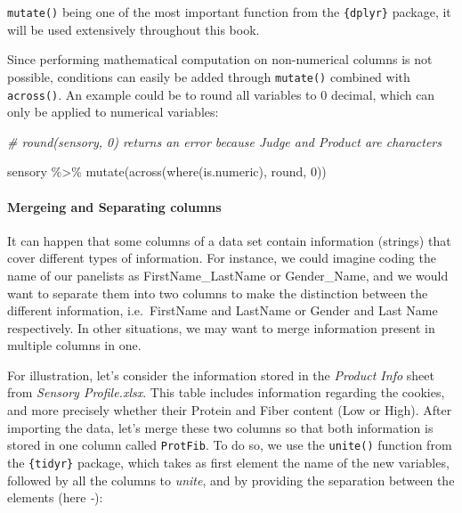\documentclass[
]{book}
\newenvironment{Shaded}{\begin{snugshade}}{\end{snugshade}}
\newcommand{\CommentTok}[1]{\textcolor[rgb]{0.56,0.35,0.01}{\textit{#1}}}
\newcommand{\DecValTok}[1]{\textcolor[rgb]{0.00,0.00,0.81}{#1}}
\newcommand{\FunctionTok}[1]{\textcolor[rgb]{0.00,0.00,0.00}{#1}}
\newcommand{\NormalTok}[1]{#1}
\newcommand{\SpecialCharTok}[1]{\textcolor[rgb]{0.00,0.00,0.00}{#1}}
\begin{document}
\texttt{mutate()} being one of the most important function from the \texttt{\{dplyr\}} package, it will be used extensively throughout this book.

Since performing mathematical computation on non-numerical columns is not possible, conditions can easily be added through \texttt{mutate()} combined with \texttt{across()}. An example could be to round all variables to 0 decimal, which can only be applied to numerical variables:

\begin{Shaded}
\begin{Highlighting}[]
\CommentTok{\# round(sensory, 0) returns an error because Judge and Product are characters}

\NormalTok{sensory }\SpecialCharTok{\%\textgreater{}\%} 
  \FunctionTok{mutate}\NormalTok{(}\FunctionTok{across}\NormalTok{(}\FunctionTok{where}\NormalTok{(is.numeric), round, }\DecValTok{0}\NormalTok{))}
\end{Highlighting}
\end{Shaded}

\hypertarget{mergeing-and-separating-columns}{%
\paragraph{Mergeing and Separating columns}\label{mergeing-and-separating-columns}}

It can happen that some columns of a data set contain information (strings) that cover different types of information. For instance, we could imagine coding the name of our panelists as FirstName\_LastName or Gender\_Name, and we would want to separate them into two columns to make the distinction between the different information, i.e.~FirstName and LastName or Gender and Last Name respectively. In other situations, we may want to merge information present in multiple columns in one.

For illustration, let's consider the information stored in the \emph{Product Info} sheet from \emph{Sensory Profile.xlsx}. This table includes information regarding the cookies, and more precisely whether their Protein and Fiber content (Low or High). After importing the data, let's merge these two columns so that both information is stored in one column called \texttt{ProtFib}.
To do so, we use the \texttt{unite()} function from the \texttt{\{tidyr\}} package, which takes as first element the name of the new variables, followed by all the columns to \emph{unite}, and by providing the separation between the elements (here \emph{-}):
\end{document}
